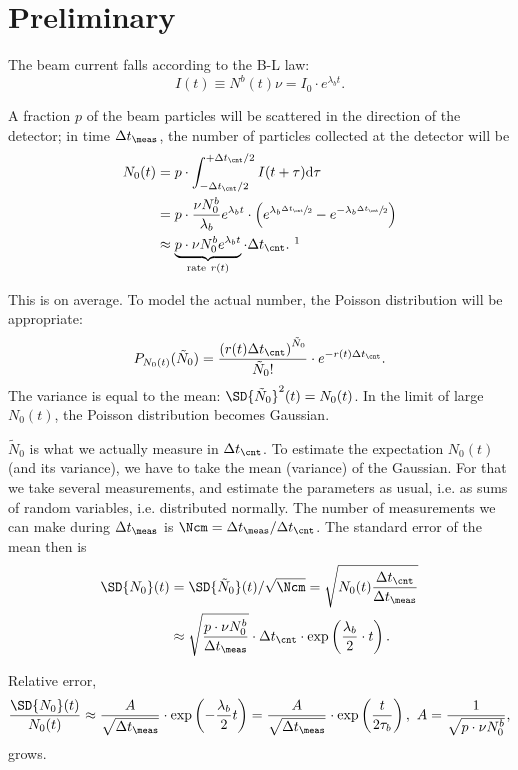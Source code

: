 \documentclass{article}
\newcommand{\dt}{\Delta t}
\newcommand{\dtm}{\dt_{\meas}}
\newcommand{\dtc}{\dt_{\cnt}}
\newcommand{\LTb}{\tau_b}
\newcommand{\lamb}{\lambda_b}
\begin{document}
	
		
\section*{Preliminary}

The beam current falls according to the B-L law:
\[
	I(t) \equiv N^b(t)\nu = I_0\cdot e^{\lamb t}.
\]

A fraction $p$ of the beam particles will be scattered in the direction of the detector; in time $\dtm$, the number of particles collected at the detector will be
\begin{align}
	N_0(t) & = p\cdot\int_{-\dtc/2}^{+\dtc/2} I(t+\tau)\td\tau \notag                    \\
	       & = p\cdot\frac{\nu N_0^b}{\lamb} e^{\lamb t}\cdot \bkt{e^{\lamb\sfrac{\dtc}{2}} - e^{-\lamb\sfrac{\dtc}{2}}} \notag \\
	       & \approx \underbrace{p\cdot\nu N_0^b e^{\lamb t}}_{\text{rate}~r(t)} \cdot\dtc.~\footnotemark
\end{align}

This is on average. To model the actual number, the Poisson distribution will be appropriate:
\[
	P_{N_0(t)}(\tilde{N}_0) = \frac{\bkt{r(t)\dtc}^{\tilde{N}_0}}{\tilde{N}_0!}\cdot e^{-r(t)\dtc}.
\]
The variance is equal to the mean: $\SD{\tilde{N}_0}^2(t) = N_0(t)$. In the limit of large $N_0(t)$, the Poisson distribution becomes Gaussian.

$\tilde{N}_0$ is what we actually measure in $\dtc$. To estimate the expectation $N_0(t)$ (and its variance), we have to take the mean (variance) of the Gaussian. For that we take several measurements, and estimate the parameters as usual, i.e. as sums of random variables, i.e. distributed normally. The number of measurements we can make during $\dtm$ is $\Ncm = \dtm/\dtc$. The standard error of the mean then is 
\begin{align}\label{eq:MeasSE}
	\SD{N_0}(t) & = \SD{\tilde{N}_0}(t)/\sqrt{\Ncm} = \sqrt{N_0(t)\frac{\dtc}{\dtm}}            \notag \\
	            & \approx \sqrt{\frac{p\cdot\nu N_0^b}{\dtm}}\cdot\dtc \cdot\exp\bkt{\frac{\lamb}{2}\cdot t}.
\end{align}
\newcommand{\A}{\frac{1}{\sqrt{p\cdot\nu N_0^b}}}

Relative error,
\[
	\frac{\SD{N_0}(t)}{N_0(t)} \approx \frac{A}{\sqrt{\dtm}}\cdot\exp\bkt{-\frac{\lamb}{2}t} = \frac{A}{\sqrt{\dtm}}\cdot\exp\bkt{\frac{t}{2\LTb}},~ A=\A,
\]
grows.
\end{document}
